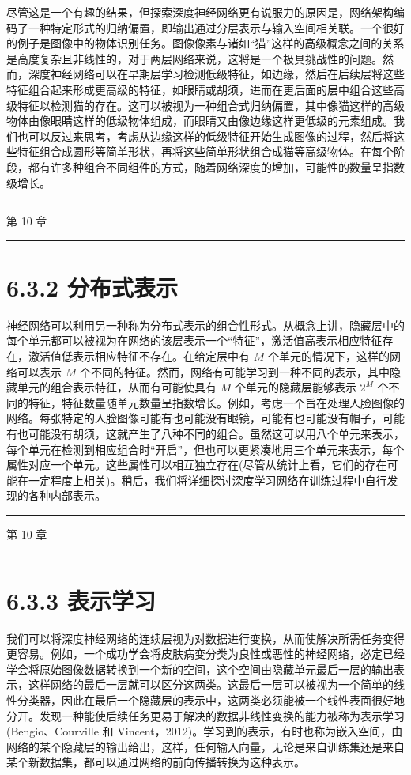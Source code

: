 \documentclass[10pt]{article}
\newcommand{\HRule}{\begin{center}\rule{0.9\linewidth}{0.2mm}\end{center}}
\begin{document}
尽管这是一个有趣的结果，但探索深度神经网络更有说服力的原因是，网络架构编码了一种特定形式的归纳偏置，即输出通过分层表示与输入空间相关联。一个很好的例子是图像中的物体识别任务。图像像素与诸如“猫”这样的高级概念之间的关系是高度复杂且非线性的，对于两层网络来说，这将是一个极具挑战性的问题。然而，深度神经网络可以在早期层学习检测低级特征，如边缘，然后在后续层将这些特征组合起来形成更高级的特征，如眼睛或胡须，进而在更后面的层中组合这些高级特征以检测猫的存在。这可以被视为一种组合式归纳偏置，其中像猫这样的高级物体由像眼睛这样的低级物体组成，而眼睛又由像边缘这样更低级的元素组成。我们也可以反过来思考，考虑从边缘这样的低级特征开始生成图像的过程，然后将这些特征组合成圆形等简单形状，再将这些简单形状组合成猫等高级物体。在每个阶段，都有许多种组合不同组件的方式，随着网络深度的增加，可能性的数量呈指数级增长。

\HRule

第 10 章

\HRule

\section*{6.3.2 分布式表示}

神经网络可以利用另一种称为分布式表示的组合性形式。从概念上讲，隐藏层中的每个单元都可以被视为在网络的该层表示一个“特征”，激活值高表示相应特征存在，激活值低表示相应特征不存在。在给定层中有 \(M\) 个单元的情况下，这样的网络可以表示 \(M\) 个不同的特征。然而，网络有可能学习到一种不同的表示，其中隐藏单元的组合表示特征，从而有可能使具有 \(M\) 个单元的隐藏层能够表示 \({2}^{M}\) 个不同的特征，特征数量随单元数量呈指数增长。例如，考虑一个旨在处理人脸图像的网络。每张特定的人脸图像可能有也可能没有眼镜，可能有也可能没有帽子，可能有也可能没有胡须，这就产生了八种不同的组合。虽然这可以用八个单元来表示，每个单元在检测到相应组合时“开启”，但也可以更紧凑地用三个单元来表示，每个属性对应一个单元。这些属性可以相互独立存在(尽管从统计上看，它们的存在可能在一定程度上相关)。稍后，我们将详细探讨深度学习网络在训练过程中自行发现的各种内部表示。

\HRule

第 10 章

\HRule

\section*{6.3.3 表示学习}

我们可以将深度神经网络的连续层视为对数据进行变换，从而使解决所需任务变得更容易。例如，一个成功学会将皮肤病变分类为良性或恶性的神经网络，必定已经学会将原始图像数据转换到一个新的空间，这个空间由隐藏单元最后一层的输出表示，这样网络的最后一层就可以区分这两类。这最后一层可以被视为一个简单的线性分类器，因此在最后一个隐藏层的表示中，这两类必须能被一个线性表面很好地分开。发现一种能使后续任务更易于解决的数据非线性变换的能力被称为表示学习(Bengio、Courville 和 Vincent，2012)。学习到的表示，有时也称为嵌入空间，由网络的某个隐藏层的输出给出，这样，任何输入向量，无论是来自训练集还是来自某个新数据集，都可以通过网络的前向传播转换为这种表示。
\end{document}
